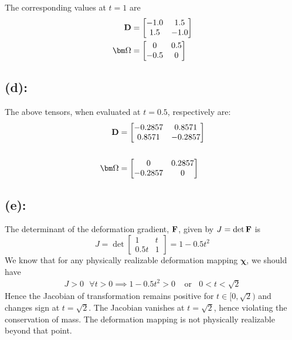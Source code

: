 The corresponding values at $t=1$ are 
\begin{align*}
{\bf D}
& = 
\begin{bmatrix}
-1.0 & 1.5 \\
1.5 & -1.0
\end{bmatrix} \\
{\bm\Omega}
& = 
\begin{bmatrix}
0 & 0.5 \\
-0.5 & 0
\end{bmatrix}
\end{align*}
\subsection*{(d):}
The above tensors, when evaluated at $t=0.5$, respectively are:
\begin{align*}
{\bf D}
& = 
\begin{bmatrix}
-0.2857 & 0.8571\\
0.8571 & -0.2857
\end{bmatrix} \\ \\
{\bm\Omega}
& =
\begin{bmatrix}
0 & 0.2857\\
-0.2857 & 0
\end{bmatrix}
\end{align*}
\subsection*{(e):}
The determinant of the deformation gradient, $\bf F$, given by $J=\det\bf F$ is
\[
J = \det \begin{bmatrix}
1 & t\\
0.5t & 1
\end{bmatrix} = 1-0.5t^2
\]
We know that for any physically realizable deformation mapping $\bm\chi$, we should have 
\begin{align*}
J>0\ \ \  \forall t > 0 \implies 1-0.5t^2 > 0\ \ \ \ \ \text{or}\ \ \ \ 0<t<\sqrt{2}
\end{align*}
Hence the Jacobian of transformation remains positive for $t\in [0,\sqrt{2})$ and changes sign at $t=\sqrt{2}$. The Jacobian vanishes at $t=\sqrt{2}$, hence violating the conservation of mass. The deformation mapping is not physically realizable beyond that point.  
